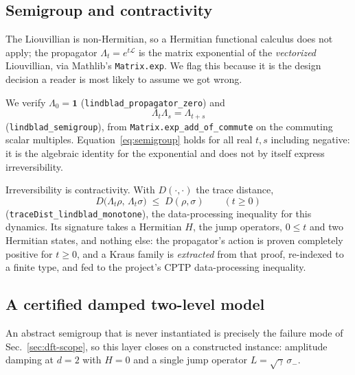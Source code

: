 \documentclass[aps,prd,reprint,nofootinbib,superscriptaddress]{revtex4-2}
\newcommand{\thm}[1]{\texttt{#1}}   %
\begin{document}
\subsection{Semigroup and contractivity}

The Liouvillian is non-Hermitian, so a Hermitian functional calculus does not apply; the propagator
$\Lambda_{t}=e^{t\mathcal{L}}$ is the matrix exponential of the \emph{vectorized} Liouvillian, via
Mathlib's \texttt{Matrix.exp}. We flag this because it is the design decision a reader is most likely
to assume we got wrong.

We verify $\Lambda_{0}=\mathbf{1}$ (\thm{lindblad\_propagator\_zero}) and
\begin{equation}
\Lambda_{t}\Lambda_{s} = \Lambda_{t+s}
\label{eq:semigroup}
\end{equation}
(\thm{lindblad\_semigroup}), from \texttt{Matrix.exp\_add\_of\_commute} on the commuting scalar
multiples. Equation~\eqref{eq:semigroup} holds for all real $t,s$ including negative: it is the
algebraic identity for the exponential and does not by itself express irreversibility.

Irreversibility is contractivity. With $D(\cdot,\cdot)$ the trace distance,
\begin{equation}
D\bigl(\Lambda_{t}\rho,\,\Lambda_{t}\sigma\bigr) \;\le\; D(\rho,\sigma)
\qquad (t\ge0)
\label{eq:contractivity}
\end{equation}
(\thm{traceDist\_lindblad\_monotone}), the data-processing inequality for this dynamics. Its
signature takes a Hermitian $H$, the jump operators, $0\le t$ and two Hermitian states, and nothing
else: the propagator's action is proven completely positive for $t\ge0$, and a Kraus family is
\emph{extracted} from that proof, re-indexed to a finite type, and fed to the project's CPTP
data-processing inequality.

\subsection{A certified damped two-level model}
\label{sec:damped}

An abstract semigroup that is never instantiated is precisely the failure mode of
Sec.~\ref{sec:dft-scope}, so this layer closes on a constructed instance: amplitude damping at $d=2$
with $H=0$ and a single jump operator $L=\sqrt{\gamma}\,\sigma_{-}$.
\end{document}

